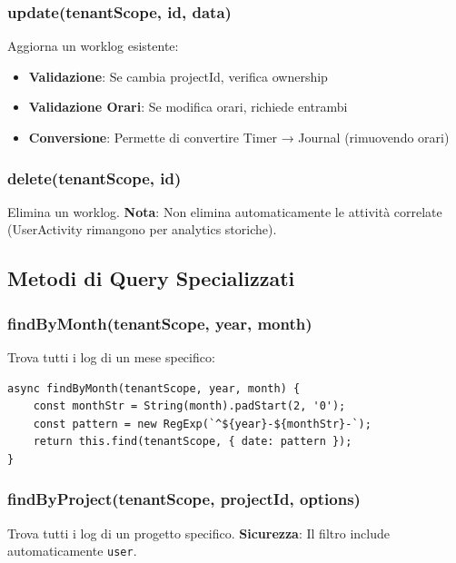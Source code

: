 \documentclass[11pt,a4paper]{article}
\begin{document}
\subsubsection{update(tenantScope, id, data)}

Aggiorna un worklog esistente:

\begin{itemize}
    \item \textbf{Validazione}: Se cambia projectId, verifica ownership
    \item \textbf{Validazione Orari}: Se modifica orari, richiede entrambi
    \item \textbf{Conversione}: Permette di convertire Timer → Journal (rimuovendo orari)
\end{itemize}

\subsubsection{delete(tenantScope, id)}

Elimina un worklog. \textbf{Nota}: Non elimina automaticamente le attività correlate (UserActivity rimangono per analytics storiche).

\subsection{Metodi di Query Specializzati}

\subsubsection{findByMonth(tenantScope, year, month)}

Trova tutti i log di un mese specifico:

\begin{lstlisting}[caption=Query per Mese]
async findByMonth(tenantScope, year, month) {
    const monthStr = String(month).padStart(2, '0');
    const pattern = new RegExp(`^${year}-${monthStr}-`);
    return this.find(tenantScope, { date: pattern });
}
\end{lstlisting}

\subsubsection{findByProject(tenantScope, projectId, options)}

Trova tutti i log di un progetto specifico. \textbf{Sicurezza}: Il filtro include automaticamente \texttt{user}.
\end{document}
